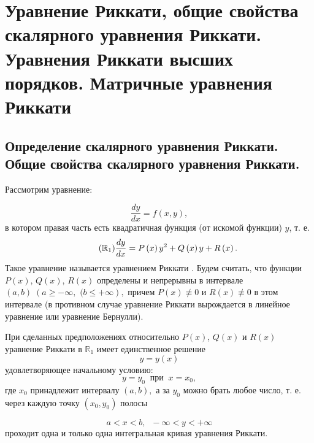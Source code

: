 \chapter{Уравнение Риккати, общие свойства скалярного уравнения Риккати. Уравнения Риккати высших порядков. Матричные уравнения Риккати} 

\section{Определение скалярного уравнения Риккати. Общие свойства скалярного уравнения Риккати.}
Рассмотрим уравнение:

$$\dfrac{dy}{dx} = f \left( x, y \right),$$
в котором правая часть есть квадратичная функция (от искомой функции) $y$, т. е.
\begin{equation}
    \tag{$\mathbb{R}_1$}
    \dfrac{dy}{dx} = P \left( x \right) y^2 + Q \left( x \right) y + R \left( x \right).
\end{equation}
Такое уравнение называется уравнением Риккати \cite{matveev}. Будем считать, что функции $P \left( x \right)$, $Q \left( x \right)$, $R \left( x \right)$ определены и непрерывны в интервале $\left( a, b \right) \; \left( a \geqslant -\infty,\right.$ $\left.( b \leqslant +\infty \right),$ причем $P \left( x \right) \not\equiv 0$ и $R \left( x \right) \not\equiv 0$ в этом интервале (в противном случае уравнение Риккати вырождается в линейное уравнение или уравнение Бернулли).

При сделанных предположениях относительно $P \left( x \right)$, $Q \left( x \right)$ и $R \left( x \right)$ уравнение Риккати в $\mathbb{R}_1$ имеет единственное решение
\begin{equation}  \label{eq:single_solution}
    y = y \left( x \right)
\end{equation}
удовлетворяющее начальному условию:
\begin{equation}  \label{eq:initial_cond}
    y = y_{0} \; \; \text{при} \; \; x = x_{0},
\end{equation}
где $x_{0}$ принадлежит интервалу $\left( a, b \right),$ а за $y_{0}$ можно брать любое число, т. е. через каждую точку $\left( x_{0}, y_{0} \right)$ полосы

\begin{equation}  \label{eq:strip}
    a < x < b, \; \; -\infty < y < +\infty
\end{equation}
проходит одна и только одна интегральная кривая уравнения Риккати.

